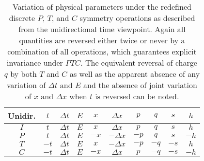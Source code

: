 \documentclass[notitlepage,12pt]{report}
\begin{document}
\begin{table}
\begin{center}
\begin{tabular}{c||c|c|c||c|c|c||c|c|c}
Unidir. & $t$  & $\Delta t$  & $E$ & $x$ & $\Delta x$ & $p$ & $q$ & $s$ & $h$ \\  \hline\hline
$I$ & $t$  & $\Delta t$  & $E$ & $x$ & $\Delta x$ & $p$ & $q$ & $s$ & $h$ \\  \hline
$P$ & $t$  & $\Delta t$  & $E$ & $-x$ & $-\Delta x$ & $-p$ & $q$ & $s$ & $-h$ \\  \hline
$T$ & $-t$ & $\Delta t$  & $E$ & $x$ & $-\Delta x$ & $-p$ & $-q$ & $-s$ & $h$  \\  \hline
$C$ & $-t$ & $\Delta t$  & $E$ & $-x$ & $\Delta x$ & $p$ & $-q$ & $-s$ & $-h$  
\end{tabular}
\end{center}
\caption[Variation of physical parameters under the redefined discrete $P$, $T$, and $C$ symmetry operations as described from the unidirectional time viewpoint]{Variation of physical parameters under the redefined discrete $P$, $T$, and $C$ symmetry operations as described from the unidirectional time viewpoint. Again all quantities are reversed either twice or never by a combination of all operations, which guarantees explicit invariance under $PTC$. The equivalent reversal of charge $q$ by both $T$ and $C$ as well as the apparent absence of any variation of $\Delta t$ and $E$ and the absence of joint variation of $x$ and $\Delta x$ when $t$ is reversed can be noted.}\label{tab:3.4}
\end{table}
\end{document}
